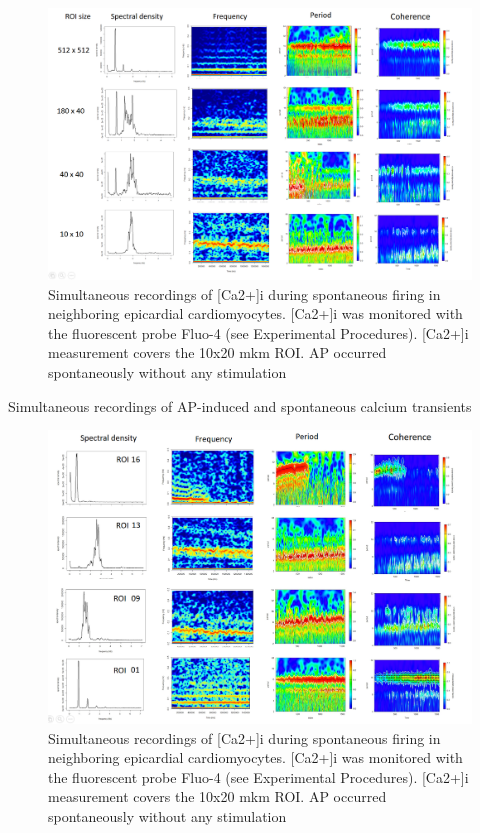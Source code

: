 \documentclass{biophys-new}
\begin{document}
\begin{figure}[hbt!]
\centering
\includegraphics[width=0.9\linewidth]{fig7.png}
\caption{Simultaneous recordings of [Ca2+]i during spontaneous firing in neighboring epicardial cardiomyocytes. [Ca2+]i was monitored with the fluorescent probe Fluo-4 (see Experimental Procedures). [Ca2+]i measurement covers the 10x20 mkm ROI. AP occurred spontaneously without any stimulation}
\label{fig:fig7}
\end{figure}


Simultaneous recordings of AP-induced and spontaneous calcium transients

\begin{figure}[hbt!]
\centering
\includegraphics[width=0.9\linewidth]{fig8.png}
\caption{Simultaneous recordings of [Ca2+]i during spontaneous firing in neighboring epicardial cardiomyocytes. [Ca2+]i was monitored with the fluorescent probe Fluo-4 (see Experimental Procedures). [Ca2+]i measurement covers the 10x20 mkm ROI. AP occurred spontaneously without any stimulation}
\label{fig:fig8}
\end{figure}
\end{document}
